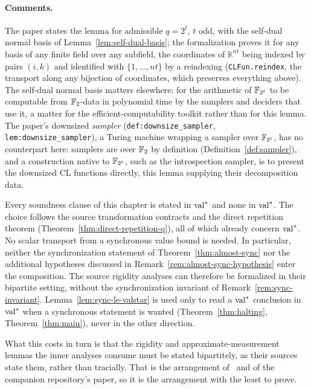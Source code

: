 \paragraph{Comments.} The paper states the lemma for admissible $q = 2^t$, $t$ odd, with the
self-dual normal basis of Lemma~\ref{lem:self-dual-basis}; the formalization proves it for any
basis of any finite field over any subfield, the coordinates of $\mathbb{K}^{nt}$ being indexed
by pairs $(i, k)$ and identified with $\{1, \ldots, nt\}$ by a reindexing
(\texttt{CLFun.reindex}, the transport along any bijection of coordinates, which preserves
everything above). The self-dual normal basis matters elsewhere: for the arithmetic of
$\mathbb{F}_{2^t}$ to be computable from $\mathbb{F}_2$-data in polynomial time by the samplers and deciders
that use it, a matter for the efficient-computability toolkit rather than for this lemma. The
paper's downsized \emph{sampler} (\texttt{def:downsize\_sampler},
\texttt{lem:downsize\_sampler}), a Turing machine wrapping a sampler over $\mathbb{F}_{2^t}$, has no
counterpart here: samplers are over $\mathbb{F}_2$ by definition (Definition~\ref{def:sampler}), and a
construction native to $\mathbb{F}_{2^t}$, such as the introspection sampler, is to present the
downsized CL functions directly, this lemma supplying their decomposition data.

\begin{remark}
\label{rem:bipartite-route}
Every soundness clause of this chapter is stated in $\mathrm{val}^*$ and none in $\mathrm{val}^{s}$. The
choice follows the source transformation contracts and the direct repetition theorem
(Theorem~\ref{thm:direct-repetition-q}), all of which already concern $\mathrm{val}^*$.
No scalar transport from a synchronous value bound is needed. In particular, neither
the synchronization statement of Theorem~\ref{thm:almost-sync} nor the additional
hypotheses discussed in Remark~\ref{rem:almost-sync-hypothesis} enter the composition.
The source rigidity analyses can therefore be formalized in their bipartite setting,
without the synchronization invariant of Remark~\ref{rem:sync-invariant}.
Lemma~\ref{lem:sync-le-valstar} is used only to read a $\mathrm{val}^*$ conclusion in $\mathrm{val}^{s}$ when
a synchronous statement is wanted (Theorem~\ref{thm:halting}, Theorem~\ref{thm:main}),
never in the other direction.

What this costs in turn is that the rigidity and approximate-measurement lemmas the inner
analyses consume must be stated bipartitely, as their sources state them, rather than
tracially. That is the arrangement of~\cite{JNVWY20} and of the companion repository's
paper, so it is the arrangement with the least to prove.
\end{remark}

